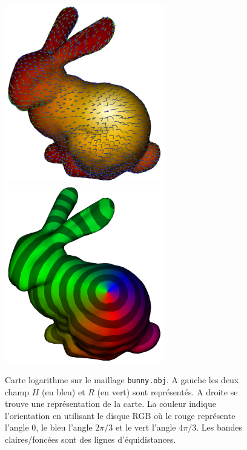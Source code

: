 \documentclass[11pt]{article}
\begin{document}
	\begin{figure}
		\centering
		\includegraphics[width=7cm]{log1_bunny.png} \; \includegraphics[width=7cm]{log2_bunny.png}
		\caption{Carte logarithme sur le maillage \texttt{bunny.obj}. A gauche les deux champ $H$ (en bleu) et $R$ (en vert) sont représentés. A droite se trouve une représentation de la carte. La couleur indique l'orientation en utilisant le disque RGB où le rouge représente l'angle 0, le bleu l'angle $2\pi/3$ et le vert l'angle $4\pi/3$. Les bandes claires/foncées sont des lignes d'équidistances.}
		\label{fig:HR}
	\end{figure}
\end{document}
